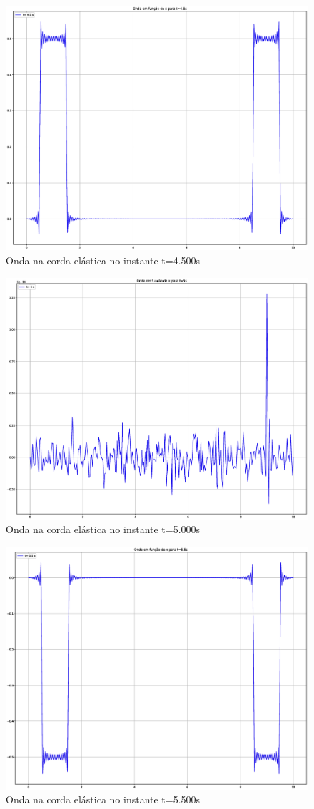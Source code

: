 \documentclass[12pt, a4paper, portuguese]{fphw}
\begin{document}
\begin{figure}[H]
	\centering
	\includegraphics[width=.8\linewidth]{"graficos/grafico_t=4.500s"}
	\caption{Onda na corda elástica no instante t=4.500s}
	\label{fig:grafico-t4.5}
\end{figure}

\begin{figure}[H]
	\centering
	\includegraphics[width=.8\linewidth]{"graficos/grafico_t=5.000s"}
	\caption{Onda na corda elástica no instante t=5.000s}
	\label{fig:grafico-t5}
\end{figure}

\begin{figure}[H]
	\centering
	\includegraphics[width=.8\linewidth]{"graficos/grafico_t=5.500s"}
	\caption{Onda na corda elástica no instante t=5.500s}
	\label{fig:grafico-t5.5}
\end{figure}
\end{document}
